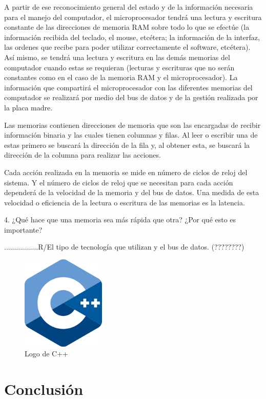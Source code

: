 \documentclass{article}
\begin{document}
A partir de ese reconocimiento general del estado y de la información necesaria para el manejo del computador, el microprocesador tendrá una lectura y escritura constante de las direcciones de memoria RAM sobre todo lo que se efectúe (la información recibida del teclado, el mouse, etcétera; la información de la interfaz, las ordenes que recibe para poder utilizar correctamente el software, etcétera). Así mismo, se tendrá una lectura y escritura en las demás memorias del computador cuando estas se requieran (lecturas y escrituras que no serán constantes como en el caso de la memoria RAM y el microprocesador). La información que compartirá el microprocesador con las diferentes memorias del computador se realizará por medio del bus de datos y de la gestión realizada por la placa madre.

Las memorias contienen direcciones de memoria que son las encargadas de recibir información binaria y las cuales tienen columnas y filas. Al leer o escribir una de estas primero se buscará la dirección de la fila y, al obtener esta, se buscará la dirección de la columna para realizar las acciones.

Cada acción realizada en la memoria se mide en número de ciclos de reloj del sistema. Y el número de ciclos de reloj que se necesitan para cada acción dependerá de la velocidad de la memoria y del bus de datos. Una medida de esta velocidad o eficiencia de la lectura o escritura de las memorias es la latencia.


\vspace{0.5cm}
4. ¿Qué hace que una memoria sea más rápida que otra? ¿Por qué esto es importante?

.................R/El tipo de tecnología que utilizan y el bus de datos. (????????)


\vspace{0.5cm}







\begin{figure}[h]
\includegraphics[width=4cm]{cpplogo.png}
\centering
\caption{Logo de C++}
\label{fig:cpplogo}
\end{figure}


\section{Conclusión} \label{conclulsion}



\end{document}
